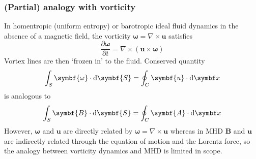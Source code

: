 \documentclass{jknotes}
\newcommand{\B}{\symbf{B}}
\renewcommand{\u}{\symbf{u}}
\begin{document}
\subsubsection{ (Partial) analogy with vorticity}
In homentropic (uniform entropy) or barotropic ideal fluid dynamics in the
absence of a magnetic field, the vorticity $\symbf{\omega} = \nabla \times \u$
satisfies
\begin{equation}
	\frac{\partial \symbf{\omega}}{\partial t} = \nabla \times (\u \times
	\symbf{\omega})
\end{equation}
Vortex lines are then `frozen in' to the fluid. Conserved quantity
\begin{equation}
	\int_S \symbf{\omega} \cdot \diffd \symbf{S} = \oint_C \u \cdot \diffd
	\x
\end{equation}
is analogous to
\begin{equation}
	\int_S \B \cdot \diffd \symbf{S} = \oint_C \symbf{A}\cdot\diffd \x
\end{equation}
However, $\symbf{\omega}$ and $\u$ are directly related by $\symbf{\omega} =
\nabla \times \u$ whereas in MHD $\B$ and $\u$ are indirectly related through
the equation of motion and the Lorentz force, so the analogy between vorticity
dynamics and MHD is limited in scope.
\end{document}
